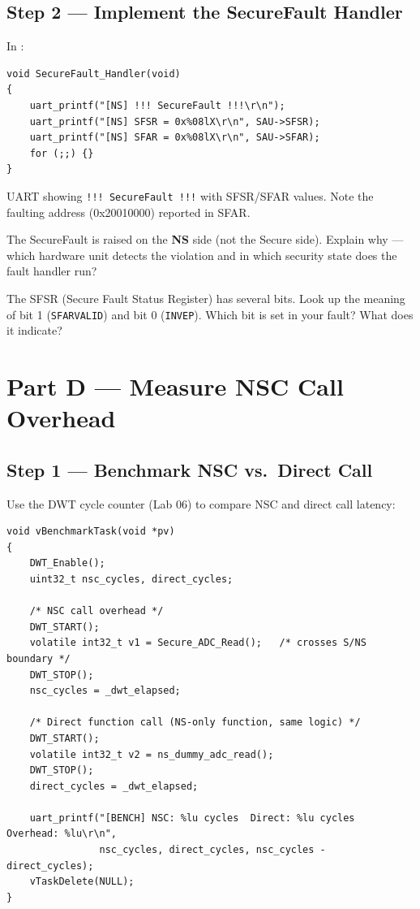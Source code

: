 \documentclass[11pt, a4paper]{article}
\begin{document}
\subsection{Step 2 --- Implement the SecureFault Handler}

In :

\begin{lstlisting}[style=cstyle]
void SecureFault_Handler(void)
{
    uart_printf("[NS] !!! SecureFault !!!\r\n");
    uart_printf("[NS] SFSR = 0x%08lX\r\n", SAU->SFSR);
    uart_printf("[NS] SFAR = 0x%08lX\r\n", SAU->SFAR);
    for (;;) {}
}
\end{lstlisting}

\begin{checkpointbox}[~C]
  UART showing \texttt{!!! SecureFault !!!} with SFSR/SFAR values.
  Note the faulting address (0x20010000) reported in SFAR.
\end{checkpointbox}

\begin{questionbox}[~C1]
  The SecureFault is raised on the \textbf{NS} side (not the Secure side). Explain
  why --- which hardware unit detects the violation and in which security state does
  the fault handler run?
\end{questionbox}

\begin{questionbox}[~C2]
  The SFSR (Secure Fault Status Register) has several bits. Look up the meaning of
  bit 1 (\texttt{SFARVALID}) and bit 0 (\texttt{INVEP}). Which bit is set in your
  fault? What does it indicate?
\end{questionbox}

\section{Part D --- Measure NSC Call Overhead}

\subsection{Step 1 --- Benchmark NSC vs.\ Direct Call}

Use the DWT cycle counter (Lab 06) to compare NSC and direct call latency:

\begin{lstlisting}[style=cstyle]
void vBenchmarkTask(void *pv)
{
    DWT_Enable();
    uint32_t nsc_cycles, direct_cycles;

    /* NSC call overhead */
    DWT_START();
    volatile int32_t v1 = Secure_ADC_Read();   /* crosses S/NS boundary */
    DWT_STOP();
    nsc_cycles = _dwt_elapsed;

    /* Direct function call (NS-only function, same logic) */
    DWT_START();
    volatile int32_t v2 = ns_dummy_adc_read();
    DWT_STOP();
    direct_cycles = _dwt_elapsed;

    uart_printf("[BENCH] NSC: %lu cycles  Direct: %lu cycles  Overhead: %lu\r\n",
                nsc_cycles, direct_cycles, nsc_cycles - direct_cycles);
    vTaskDelete(NULL);
}
\end{lstlisting}
\end{document}
